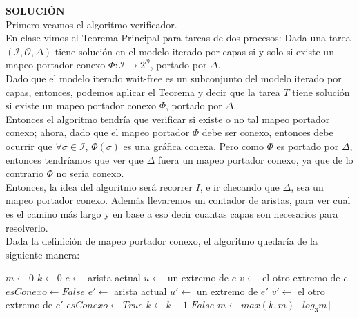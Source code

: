 \documentclass{article}
\begin{document}
\begin{enumerate}
{    \textbf{SOLUCIÓN}\\
    Primero veamos el algoritmo verificador.\\
    En clase vimos el Teorema Principal para tareas de dos procesos: Dada una tarea $(\mathcal{I},\mathcal{O},\Delta)$
    tiene solución en el modelo iterado por capas si y solo si existe un mapeo portador conexo
    $\Phi: \mathcal{I} \rightarrow 2^{\mathcal{O}}$, portado por $\Delta$.\\
    Dado que el modelo iterado wait-free es un subconjunto del modelo iterado por capas, entonces, podemos
    aplicar el Teorema y decir que la tarea $T$ tiene solución si existe un mapeo portador conexo $\Phi$, portado por $\Delta$.\\
    Entonces el algoritmo tendría que verificar si existe o no tal mapeo portador conexo; ahora, dado que el mapeo portador
    $\Phi$ debe ser conexo, entonces debe ocurrir que $\forall\sigma\in\mathcal{I}$, $\Phi(\sigma)$ es una
    gráfica conexa. Pero como $\Phi$ es portado por $\Delta$, entonces tendríamos que ver que $\Delta$ fuera un mapeo portador
    conexo, ya que de lo contrario $\Phi$ no sería conexo.\\
    Entonces, la idea del algoritmo será recorrer $I$, e ir checando que $\Delta$, sea un mapeo portador conexo.
    Además llevaremos un contador de aristas, para ver cual es el camino más largo y en base a eso decir cuantas capas
    son necesarios para resolverlo.\\
    Dada la definición de mapeo portador conexo, el algoritmo quedaría de la siguiente manera:\\
    
    \begin{algorithmic}
    \STATE $m \leftarrow 0$
    \STATE $k \leftarrow 0$
    \STATE $e \leftarrow $ arista actual
    \STATE $u \leftarrow $ un extremo de $e$
    \STATE $v \leftarrow $ el otro extremo de $e$
    \STATE $esConexo \leftarrow False$
    \STATE $e' \leftarrow $ arista actual
    \STATE $u' \leftarrow $ un extremo de $e'$
    \STATE $v' \leftarrow $ el otro extremo de $e'$
    \STATE $esConexo \leftarrow True$
    \ENDIF
    \STATE $k \leftarrow k + 1$
    \ENDIF
    \ENDFOR
    \RETURN $False$
    \ENDIF
    \STATE $m \leftarrow max(k, m)$
    \ENDFOR
    \RETURN $\lceil log_{3} m \rceil$
    \end{algorithmic}

}
\end{enumerate}
\end{document}

